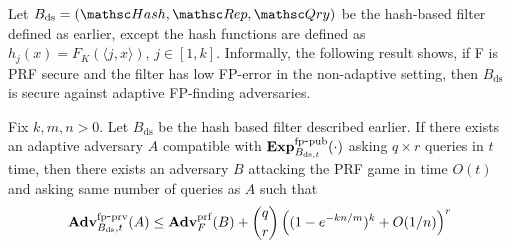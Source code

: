 \newcommand{\FK}{F_K(\langle j,x \rangle)}
\newcommand{\rhoK}{\rho(\langle j,x \rangle)}


Let $B_{\mathrm{ds}}=(\Hash,\Rep,\Qry)$ be the hash-based filter defined as earlier, except the hash functions are defined as $h_j(x) = \FK, \, j \in [1,k]$. Informally, the following result shows, if F is PRF secure and the filter has low FP-error in the non-adaptive setting, then $B_{\mathrm{ds}}$ is secure against adaptive FP-finding adversaries.

\begin{theorem}\label{thm2}
Fix $k,m,n >0$. Let $B_{\mathrm{ds}}$ be the hash based filter described earlier. If there exists an adaptive adversary $A$ compatible with $\mathrm{\mathbf{Exp}}^{\mathrm{fp\mbox{-}pub}}_{B_{\mathrm{ds},t}}(\cdot)$ asking $q \times r$ queries in $t$ time, then there exists an adversary $B$ attacking the PRF game in time $O(t)$ and asking same number of queries as $A$ such that 
\begin{equation}
\mathrm{\mathbf{Adv}}^{\mathrm{fp\mbox{-}prv}}_{B_\mathrm{ds},t}(A)\leq  \mathbf{Adv}^{\mathrm{prf}}_{F}(B)  + {\dbinom{q}{r}} \left( (1-e^{-kn/m})^k + O(1/n) \right)^r
\end{equation}
\end{theorem}

